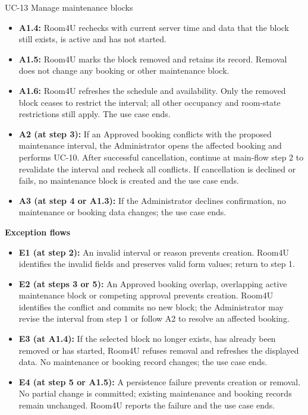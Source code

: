 \begin{usecasebox}{UC-13 Manage maintenance blocks}
\begin{itemize}[label={},leftmargin=0pt,itemsep=1pt,topsep=1pt]
  \item \textbf{A1.4:} Room4U rechecks with current server time and data that the block still exists, is active and has not started.
  \item \textbf{A1.5:} Room4U marks the block removed and retains its record. Removal does not change any booking or other maintenance block.
  \item \textbf{A1.6:} Room4U refreshes the schedule and availability. Only the removed block ceases to restrict the interval; all other occupancy and room-state restrictions still apply. The use case ends.
  \item \textbf{A2 (at step 3):} If an Approved booking conflicts with the proposed maintenance interval, the Administrator opens the affected booking and performs UC-10. After successful cancellation, continue at main-flow step 2 to revalidate the interval and recheck all conflicts. If cancellation is declined or fails, no maintenance block is created and the use case ends.
  \item \textbf{A3 (at step 4 or A1.3):} If the Administrator declines confirmation, no maintenance or booking data changes; the use case ends.
\end{itemize}
\textbf{Exception flows}
\begin{itemize}[label={},leftmargin=0pt,itemsep=1pt,topsep=1pt]
  \item \textbf{E1 (at step 2):} An invalid interval or reason prevents creation. Room4U identifies the invalid fields and preserves valid form values; return to step 1.
  \item \textbf{E2 (at steps 3 or 5):} An Approved booking overlap, overlapping active maintenance block or competing approval prevents creation. Room4U identifies the conflict and commits no new block; the Administrator may revise the interval from step 1 or follow A2 to resolve an affected booking.
  \item \textbf{E3 (at A1.4):} If the selected block no longer exists, has already been removed or has started, Room4U refuses removal and refreshes the displayed data. No maintenance or booking record changes; the use case ends.
  \item \textbf{E4 (at step 5 or A1.5):} A persistence failure prevents creation or removal. No partial change is committed; existing maintenance and booking records remain unchanged. Room4U reports the failure and the use case ends.
\end{itemize}
\end{usecasebox}

